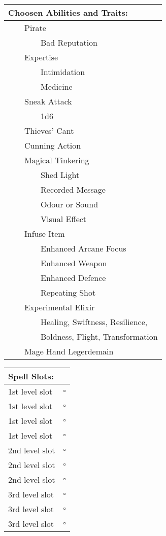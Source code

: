 \documentclass[11pt]{article}
\newcommand{\available}{$\square$}
\newcommand{\tabitem}{~~\llap{--}~~}
\newcommand{\tabtabitem}{~~~~~~\llap{$\bullet$}~~}
\begin{document}
\begin{multicols}{2}
\vspace{4mm}

\noindent \begin{tabularx}{95mm}{@{}l}
{\Large \textbf{Choosen Abilities and Traits:}} \\
\hline
\tabitem Pirate \\
\tabtabitem Bad Reputation \\
\tabitem Expertise \\
\tabtabitem Intimidation \\
\tabtabitem Medicine \\
\tabitem Sneak Attack \\
\tabtabitem 1d6 \\
\tabitem Thieves' Cant \\
\tabitem Cunning Action \\
\tabitem Magical Tinkering \\
\tabtabitem Shed Light \\
\tabtabitem Recorded Message \\
\tabtabitem Odour or Sound \\
\tabtabitem Visual Effect \\
\tabitem Infuse Item \\
\tabtabitem Enhanced Arcane Focus \\
\tabtabitem Enhanced Weapon \\
\tabtabitem Enhanced Defence \\
\tabtabitem Repeating Shot \\
\tabitem Experimental Elixir \\
\tabtabitem Healing, Swiftness, Resilience, \\
\tabtabitem Boldness, Flight, Transformation \\
\tabitem Mage Hand Legerdemain
		\end{tabularx}

\vspace{4mm}

\noindent \begin{tabularx}{95mm}{@{}l c}
{\Large \textbf{Spell Slots:}} \\
\hline
1st level slot & \available \\
1st level slot & \available \\
1st level slot & \available \\
1st level slot & \available \\
2nd level slot & \available \\
2nd level slot & \available \\
2nd level slot & \available \\
3rd level slot & \available \\
3rd level slot & \available \\
3rd level slot & \available
		\end{tabularx}


\end{multicols}
\end{document}

